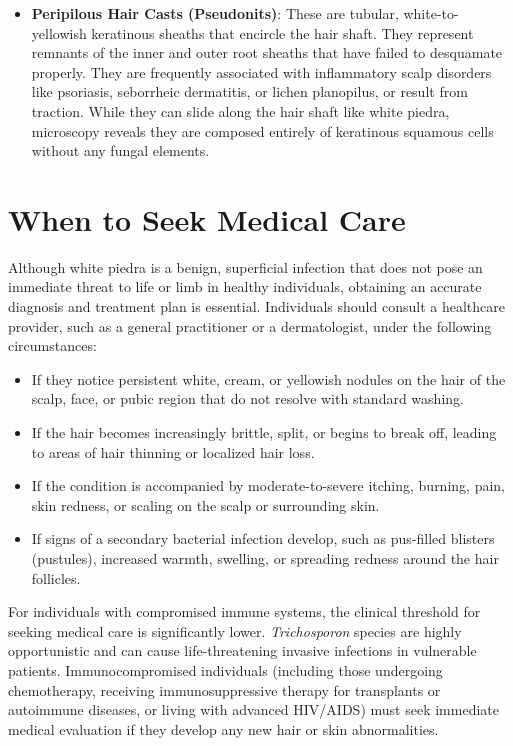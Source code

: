 \begin{itemize}
    \item \textbf{Peripilous Hair Casts (Pseudonits)}: These are tubular, white-to-yellowish keratinous sheaths that encircle the hair shaft. They represent remnants of the inner and outer root sheaths that have failed to desquamate properly. They are frequently associated with inflammatory scalp disorders like psoriasis, seborrheic dermatitis, or lichen planopilus, or result from traction. While they can slide along the hair shaft like white piedra, microscopy reveals they are composed entirely of keratinous squamous cells without any fungal elements.
\end{itemize}

\section*{When to Seek Medical Care}
Although white piedra is a benign, superficial infection that does not pose an immediate threat to life or limb in healthy individuals, obtaining an accurate diagnosis and treatment plan is essential. Individuals should consult a healthcare provider, such as a general practitioner or a dermatologist, under the following circumstances:
\begin{itemize}
    \item If they notice persistent white, cream, or yellowish nodules on the hair of the scalp, face, or pubic region that do not resolve with standard washing.
    \item If the hair becomes increasingly brittle, split, or begins to break off, leading to areas of hair thinning or localized hair loss.
    \item If the condition is accompanied by moderate-to-severe itching, burning, pain, skin redness, or scaling on the scalp or surrounding skin.
    \item If signs of a secondary bacterial infection develop, such as pus-filled blisters (pustules), increased warmth, swelling, or spreading redness around the hair follicles.
\end{itemize}

For individuals with compromised immune systems, the clinical threshold for seeking medical care is significantly lower. \textit{Trichosporon} species are highly opportunistic and can cause life-threatening invasive infections in vulnerable patients. Immunocompromised individuals (including those undergoing chemotherapy, receiving immunosuppressive therapy for transplants or autoimmune diseases, or living with advanced HIV/AIDS) must seek immediate medical evaluation if they develop any new hair or skin abnormalities.

